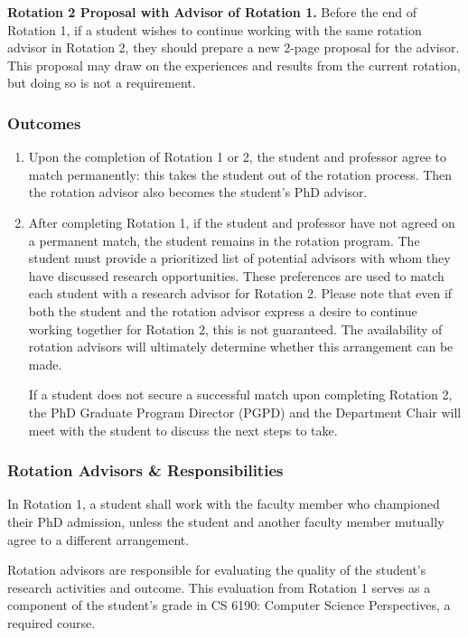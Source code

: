 \textbf{Rotation 2 Proposal with Advisor of Rotation 1.}
Before the end of Rotation 1, if a student wishes to continue working with the
same rotation advisor in Rotation 2, they should prepare a new 2-page proposal
for the advisor. This proposal may draw on the experiences and results from the
current rotation, but doing so is not a requirement.


\subsubsection{Outcomes}


\begin{enumerate}[nosep]
\item Upon the completion of Rotation 1 or 2, the student and professor agree to
 match permanently: this takes the student out of the rotation process. Then
 the rotation advisor also becomes the student's PhD advisor.
\item After completing Rotation 1, if the student and professor have not agreed
 on a permanent match, the student remains in the rotation program. The student
 must provide a prioritized list of potential advisors with whom they have
 discussed research opportunities. These preferences are used to match each
 student with a research advisor for Rotation 2. Please note that even if both
 the student and the rotation advisor express a desire to continue working
 together for Rotation 2, this is not guaranteed. The availability of rotation
 advisors will ultimately determine whether this arrangement can be made.

 If a student does not secure a successful match upon completing Rotation 2, the
 PhD Graduate Program Director (PGPD) and the Department Chair will meet with the
 student to discuss the next steps to take.
\end{enumerate}

\subsubsection{Rotation Advisors \& Responsibilities}

In Rotation 1, a student shall work with the faculty member who championed their
PhD admission, unless the student and another faculty member mutually agree to
a different arrangement.

Rotation advisors are responsible for evaluating the quality of the student’s
research activities and outcome. This evaluation from Rotation 1 serves as a
component of the student’s grade in CS 6190: Computer Science Perspectives, a
required course.

